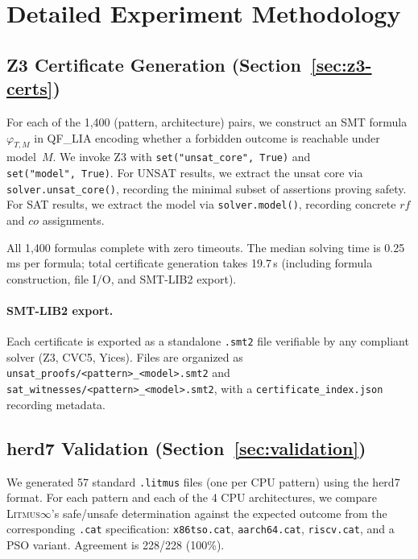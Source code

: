 \documentclass[11pt]{article}
\newcommand{\litmus}{\textsc{Litmus$\infty$}}
\begin{document}
\section{Detailed Experiment Methodology}
\label{app:methodology}

\subsection{Z3 Certificate Generation (Section~\ref{sec:z3-certs})}

For each of the 1{,}400 (pattern, architecture) pairs, we construct an
SMT formula $\varphi_{T,M}$ in QF\_LIA encoding whether a forbidden
outcome is reachable under model~$M$.
We invoke Z3 with
\texttt{set(\allowbreak"unsat\_core",\allowbreak~True)} and
\texttt{set(\allowbreak"model",\allowbreak~True)}.
For UNSAT results, we extract the unsat core via
\texttt{solver.\allowbreak{}unsat\_core()}, recording the
minimal subset of assertions proving safety.
For SAT results, we extract the model via
\texttt{solver.\allowbreak{}model()}, recording
concrete $\mathit{rf}$ and $\mathit{co}$ assignments.

All 1{,}400 formulas complete with zero timeouts.  The median solving time
is 0.25\,ms per formula; total certificate generation takes 19.7\,s
(including formula construction, file I/O, and SMT-LIB2 export).

\paragraph{SMT-LIB2 export.}
Each certificate is exported as a standalone \texttt{.smt2} file
verifiable by any compliant solver (Z3, CVC5, Yices).
Files are organized as
\texttt{unsat\_proofs/\allowbreak<pattern>\_\allowbreak<model>.smt2}
and \texttt{sat\_witnesses/\allowbreak<pattern>\_\allowbreak<model>.smt2},
with a \texttt{certificate\_index.json} recording metadata.

\subsection{herd7 Validation (Section~\ref{sec:validation})}

We generated 57 standard \texttt{.litmus} files (one per CPU pattern)
using the herd7 format.  For each pattern and each of the 4 CPU
architectures, we compare \litmus{}'s safe/unsafe determination against
the expected outcome from the corresponding \texttt{.cat} specification:
\texttt{x86tso.cat}, \texttt{aarch64.cat}, \texttt{riscv.cat}, and
a PSO variant.  Agreement is 228/228 (100\%).
\end{document}
